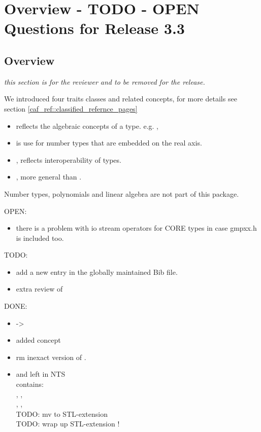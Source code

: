 \section{Overview - TODO - OPEN Questions for Release 3.3}

\subsection{Overview}
{\em this section is for the reviewer and to be removed for the release. }

We introduced four traits classes and related concepts, for more details see 
section \ref{caf_ref::classified_refernce_pages}
\begin{itemize}
\item {} reflects the algebraic concepts of a 
      type. e.g. , 
\item {} is use for number types that are embedded on 
      the real axis. 
\item {}, reflects interoperability of types. 
\item {}, more general than .
\end{itemize}

Number types, polynomials and linear algebra are not part of this package. 

OPEN:
\begin{itemize}
\item there is a problem with io stream operators for CORE types in case 
      gmpxx.h is included too. 
\end{itemize}

TODO:
\begin{itemize} 
\item add a new entry in the globally maintained Bib file.
\item extra review of 
\end{itemize}

DONE:
\begin{itemize}
\item {} -> 
\item added concept 
\item rm inexact version of . 
\item {} and  left in NTS\\
      contains: \\
      , , \\
      , , \\
      TODO: mv to STL-extension\\
      TODO: wrap up STL-extension ! 
\end{itemize}

